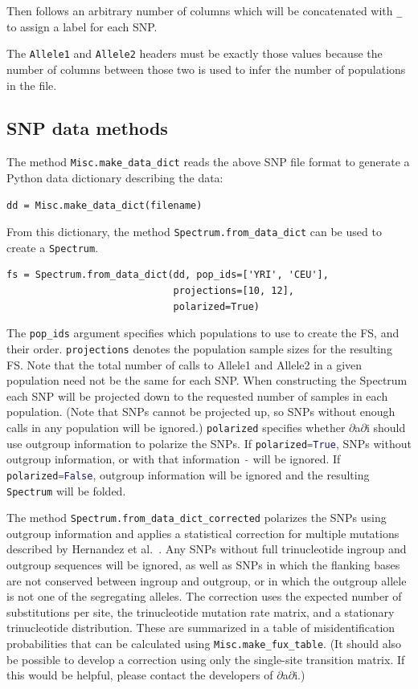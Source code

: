 \documentclass[12pt]{article}
\makeatletter
\newcommand{\dadi}{$\partial$a$\partial$i\xspace}
\newcommand{\py}[1]{\lstinline[language=Python, showstringspaces=False]@#1@}
\makeatother
\begin{document}
Then follows an arbitrary number of columns which will be concatenated with \py{_} to assign a label for each SNP.

The \py{Allele1} and \py{Allele2} headers must be exactly those values because the number of columns between those two is used to infer the number of populations in the file.

\subsection{SNP data methods}

The method \py{Misc.make_data_dict} reads the above SNP file format to generate a Python data dictionary describing the data:
\begin{lstlisting}
dd = Misc.make_data_dict(filename)
\end{lstlisting}
From this dictionary, the method \py{Spectrum.from_data_dict} can be used to create a \py{Spectrum}.
\begin{lstlisting}
fs = Spectrum.from_data_dict(dd, pop_ids=['YRI', 'CEU'],
                             projections=[10, 12],
                             polarized=True)
\end{lstlisting}
The \py{pop_ids} argument specifies which populations to use to create the FS, and their order.
\py{projections} denotes the population sample sizes for the resulting FS.
Note that the total number of calls to Allele1 and Allele2 in a given population need not be the same for each SNP.
When constructing the Spectrum each SNP will be projected down to the requested number of samples in each population.
(Note that SNPs cannot be projected up, so SNPs without enough calls in any population will be ignored.)
\py{polarized} specifies whether \dadi should use outgroup information to polarize the SNPs.
If \py{polarized=True}, SNPs without outgroup information, or with that information \py{-} will be ignored.
If \py{polarized=False}, outgroup information will be ignored and the resulting \py{Spectrum} will be folded.

The method \py{Spectrum.from_data_dict_corrected} polarizes the SNPs using outgroup information and applies a statistical correction for multiple mutations described by Hernandez et al.~\cite{bib:Hernandez2007}.
Any SNPs without full trinucleotide ingroup and outgroup sequences will be ignored, as well as SNPs in which the flanking bases are not conserved between ingroup and outgroup, or in which the outgroup allele is not one of the segregating alleles.
The correction uses the expected number of substitutions per site, the trinucleotide mutation rate matrix, and a stationary trinucleotide distribution.
These are summarized in a table of misidentification probabilities that can be calculated using \py{Misc.make_fux_table}.
(It should also be possible to develop a correction using only the single-site transition matrix.
If this would be helpful, please contact the developers of \dadi.)
\end{document}

